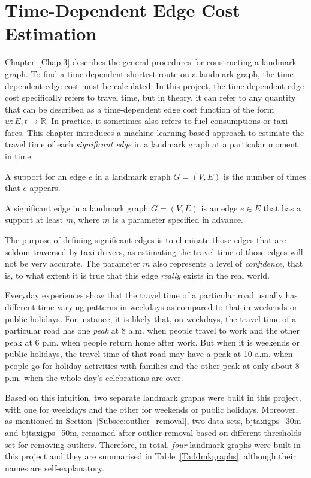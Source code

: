 \chapter{Time-Dependent Edge Cost Estimation}\label{Chap:4}
Chapter~\ref{Chap:3} describes the general procedures for constructing a landmark graph. To find a time-dependent shortest route on a landmark graph, the time-dependent edge cost must be calculated. In this project, the time-dependent edge cost specifically refers to travel time, but in theory, it can refer to any quantity that can be described as a time-dependent edge cost function of the form $w : E,t \rightarrow \mathbb{R}$. In practice, it sometimes also refers to fuel consumptions or taxi fares. This chapter introduces a machine learning-based approach to estimate the travel time of each \emph{significant edge} in a landmark graph at a particular moment in time. 

\begin{defn}
A support for an edge $e$ in a landmark graph $G=(V,E)$ is the number of times that $e$ appears. 
\end{defn}

\begin{defn}
A significant edge in a landmark graph $G=(V,E)$ is an edge $e \in E$ that has a support at least $m$, where $m$ is a parameter specified in advance.
\end{defn}

The purpose of defining significant edges is to eliminate those edges that are seldom traversed by taxi drivers, as estimating the travel time of those edges will not be very accurate. The parameter $m$ also represents a level of \emph{confidence}, that is, to what extent it is true that this edge \emph{really} exists in the real world. 

Everyday experiences show that the travel time of a particular road usually has different time-varying patterns in weekdays as compared to that in weekends or public holidays. For instance, it is likely that, on weekdays, the travel time of a particular road has one \emph{peak} at 8 a.m. when people travel to work and the other peak at 6 p.m. when people return home after work. But when it is weekends or public holidays, the travel time of that road may have a peak at 10 a.m. when people go for holiday activities with families and the other peak at only about 8 p.m. when the whole day's celebrations are over. 

Based on this intuition, two separate landmark graphs were built in this project, with one for weekdays and the other for weekends or public holidays. Moreover, as mentioned in Section~\ref{Subsec:outlier_removal}, 
two data sets, bjtaxigps\_30m and bjtaxigps\_50m, remained after outlier removal based on different thresholds set for removing outliers. Therefore, in total, \emph{four} landmark graphs were built in this project and they are summarised in Table~\ref{Ta:ldmkgraphs}, although their names are self-explanatory. 

